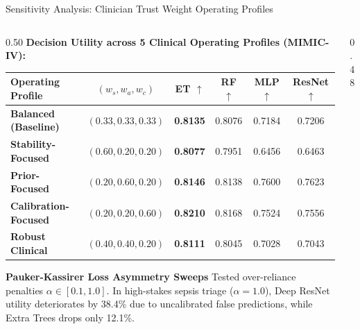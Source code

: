 \documentclass[aspectratio=169,10pt]{beamer}
\begin{document}
\begin{frame}{Sensitivity Analysis: Clinician Trust Weight Operating Profiles}
  \vspace{-0.1cm}
  \begin{columns}[t]
    \begin{column}{0.50\textwidth}
      \textbf{\scriptsize Decision Utility across 5 Clinical Operating Profiles (MIMIC-IV):}
      \vspace{0.03cm}
      \begin{table}[h]
        \centering
        \setlength{\tabcolsep}{2.2pt}
        \fontsize{5.8pt}{7pt}\selectfont
        \begin{tabular}{lccccc}
          \toprule
          \textbf{Operating Profile} & \textbf{$(w_s, w_a, w_c)$} & \textbf{ET $\uparrow$} & \textbf{RF $\uparrow$} & \textbf{MLP $\uparrow$} & \textbf{ResNet $\uparrow$} \\
          \midrule
          \textbf{Balanced (Baseline)} & $(0.33, 0.33, 0.33)$ & \textbf{0.8135} & 0.8076 & 0.7184 & 0.7206 \\
          \textbf{Stability-Focused} & $(0.60, 0.20, 0.20)$ & \textbf{0.8077} & 0.7951 & 0.6456 & 0.6463 \\
          \textbf{Prior-Focused} & $(0.20, 0.60, 0.20)$ & \textbf{0.8146} & 0.8138 & 0.7600 & 0.7623 \\
          \textbf{Calibration-Focused} & $(0.20, 0.20, 0.60)$ & \textbf{0.8210} & 0.8168 & 0.7524 & 0.7556 \\
          \textbf{Robust Clinical} & $(0.40, 0.40, 0.20)$ & \textbf{0.8111} & 0.8045 & 0.7028 & 0.7043 \\
          \bottomrule
        \end{tabular}
      \end{table}
      \vspace{-0.15cm}
      \begin{block}{\textbf{Pauker-Kassirer Loss Asymmetry Sweeps}}
        \scriptsize
        Tested over-reliance penalties $\alpha \in [0.1, 1.0]$. In high-stakes sepsis triage ($\alpha = 1.0$), Deep ResNet utility deteriorates by 38.4\% due to uncalibrated false predictions, while Extra Trees drops only 12.1\%.
      \end{block}
    \end{column}
    \begin{column}{0.48\textwidth}

\end{column}
\end{columns}
\end{frame}
\end{document}
